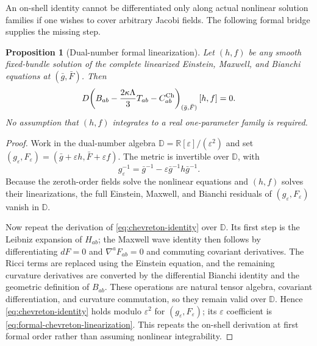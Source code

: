 \documentclass[11pt]{article}
\newtheorem{proposition}[theorem]{Proposition}
\theoremstyle{remark}
\begin{document}
An on-shell identity cannot be differentiated only along actual nonlinear
solution families if one wishes to cover arbitrary Jacobi fields. The
following formal bridge supplies the missing step.

\begin{proposition}[Dual-number formal linearization]
\label{prop:dual-number-bridge}
Let $(h,f)$ be any smooth fixed-bundle solution of the complete linearized
Einstein, Maxwell, and Bianchi equations at $(\bar g,\bar F)$. Then
\begin{equation}\label{eq:formal-chevreton-linearization}
 D\!\left(B_{ab}-\frac{2\kappa\Lambda}{3}T_{ab}
 -C^{\rm Ch}_{ab}\right)_{(\bar g,\bar F)}[h,f]=0.
\end{equation}
No assumption that $(h,f)$ integrates to a real one-parameter family is
required.
\end{proposition}

\begin{proof}
Work in the dual-number algebra
$\mathbb D=\mathbb R[\varepsilon]/(\varepsilon^2)$ and set
$(g_\varepsilon,F_\varepsilon)=(\bar g+\varepsilon h,
\bar F+\varepsilon f)$. The metric is invertible over $\mathbb D$, with
\begin{equation}
 g_\varepsilon^{-1}=\bar g^{-1}
 -\varepsilon\bar g^{-1}h\bar g^{-1}.
\end{equation}
Because the zeroth-order fields solve the nonlinear equations and $(h,f)$
solves their linearizations, the full Einstein, Maxwell, and Bianchi
residuals of $(g_\varepsilon,F_\varepsilon)$ vanish in $\mathbb D$.

Now repeat the derivation of \eqref{eq:chevreton-identity} over
$\mathbb D$. Its first step is the Leibniz expansion of $H_{ab}$; the Maxwell
wave identity then follows by differentiating $dF=0$ and
$\nabla^aF_{ab}=0$ and commuting covariant derivatives. The Ricci terms are
replaced using the Einstein equation, and the remaining curvature derivatives
are converted by the differential Bianchi identity and the geometric
definition of $B_{ab}$. These operations are natural tensor algebra,
covariant differentiation, and curvature commutation, so they remain valid
over $\mathbb D$. Hence \eqref{eq:chevreton-identity} holds modulo
$\varepsilon^2$ for $(g_\varepsilon,F_\varepsilon)$; its
$\varepsilon$ coefficient is \eqref{eq:formal-chevreton-linearization}.
This repeats the on-shell derivation at first formal order rather than
assuming nonlinear integrability.
\end{proof}
\end{document}
